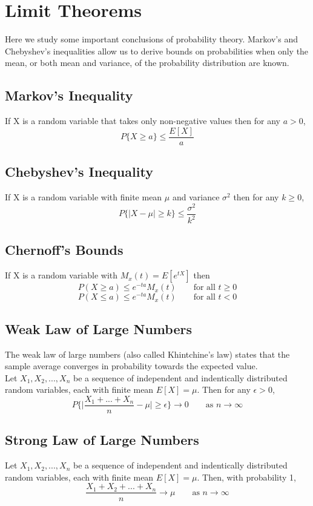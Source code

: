 \documentclass[10pt,a4paper]{article}
\begin{document}
\section{Limit Theorems}
Here we study some important conclusions of probability theory. Markov's and Chebyshev's inequalities allow us to derive bounds on probabilities when only the mean, or both mean and variance, of the probability distribution are known. 
\subsection{Markov's Inequality}
If X is a random variable that takes only non-negative values then for any $a > 0$,
$$P\{X \geq a\} \leq \frac{E[X]}{a}$$
\subsection{Chebyshev's Inequality}
If X is a random variable with finite mean $\mu$ and variance $\sigma^{2}$ then for any $k \geq 0$, $$P\{|X-\mu|\geq k\} \leq \frac{\sigma^{2}}{k^{2}}$$
\subsection{Chernoff's Bounds}
If X is a random variable with $M_{x}(t) = E[e^{tX}]$ then 
$$P(X \geq a) \leq e^{-ta}M_{x}(t) \qquad \text{for all } t \geq 0$$   
$$P(X \leq a) \leq e^{-ta}M_{x}(t) \qquad \text{for all } t < 0$$ 
\subsection{Weak Law of Large Numbers}
The weak law of large numbers (also called Khintchine's law) states that the sample average converges in probability towards the expected value.\\
Let $X_{1}, X_{2}, ..., X_{n}$ be a sequence of independent and indentically distributed random variables, each with finite mean $E[X] = \mu$. Then for any $\epsilon > 0$, $$P\bigg\{\bigg|\frac{X_{1} + ... + X_{n}}{n}-\mu\bigg| \geq \epsilon \bigg\} \to 0 \qquad \text{as } n \to \infty$$
\subsection{Strong Law of Large Numbers}
Let $X_{1}, X_{2}, ..., X_{n}$ be a sequence of independent and indentically distributed random variables, each with finite mean $E[X] = \mu$. Then, with probability 1, $$\frac{X_{1} + X_{2} + ... + X_{n}}{n} \to \mu \qquad \text{as } n \to \infty$$ 
\newpage 
\end{document}
